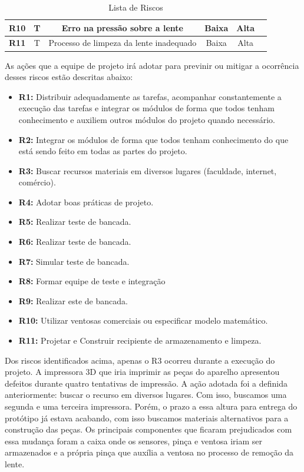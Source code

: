 \begin{table}[H]
\begin{tabular}{|l|l|l|l|l|l|}
\multicolumn{1}{|c}{\textbf{R10}} & \multicolumn{1}{|c}{T}  & \multicolumn{1}{|c}{Erro na pressão sobre a lente}            &  \multicolumn{1}{|c}{Baixa}         &         \multicolumn{1}{|c|}{Alta}                                         \\ \hline
\multicolumn{1}{|c}{\textbf{R11}} & \multicolumn{1}{|c}{T}  &  \multicolumn{1}{|c}{Processo de limpeza da lente inadequado }          &      \multicolumn{1}{|c}{Baixa}         &             \multicolumn{1}{|c|}{Alta}               \\ \hline
\end{tabular}
\caption{Lista de Riscos}
\end{table}

As ações que a equipe de projeto irá adotar para previnir ou mitigar a ocorrência desses riscos estão descritas abaixo:

\begin{itemize}
\item \textbf{R1:}  Distribuir adequadamente as tarefas, acompanhar constantemente a execução das tarefas e integrar os módulos de forma que todos tenham conhecimento e auxiliem outros módulos do projeto quando necessário.           
\item \textbf{R2:}  Integrar os módulos de forma que todos tenham conhecimento do que está sendo feito em todas as partes do projeto.       
\item \textbf{R3:}  Buscar recursos materiais em diversos lugares (faculdade, internet, comércio).          
\item \textbf{R4:}  Adotar boas práticas de projeto.   
\item \textbf{R5:} Realizar teste de bancada.    
\item \textbf{R6:} Realizar teste de bancada.            
\item \textbf{R7:} Simular teste de bancada.   
\item \textbf{R8:} Formar equipe de teste e integração             
\item \textbf{R9:} Realizar este de bancada.  
\item \textbf{R10:} Utilizar ventosas comerciais ou especificar modelo matemático.          
\item \textbf{R11:} Projetar e Construir recipiente de armazenamento e limpeza.      
\end{itemize}

Dos riscos identificados acima, apenas o R3 ocorreu durante a execução do projeto. A impressora 3D que iria imprimir as peças do aparelho apresentou defeitos durante quatro tentativas de impressão. A ação adotada foi a definida anteriormente: buscar o recurso em diversos lugares. Com isso, buscamos uma segunda e uma terceira impressora. Porém, o prazo a essa altura para entrega do protótipo já estava acabando, com isso buscamos materiais alternativos para a construção das peças. Os principais componentes que ficaram prejudicados com essa mudança foram a caixa onde os sensores, pinça e ventosa iriam ser armazenados e a própria pinça que auxília a ventosa no processo de remoção da lente.

